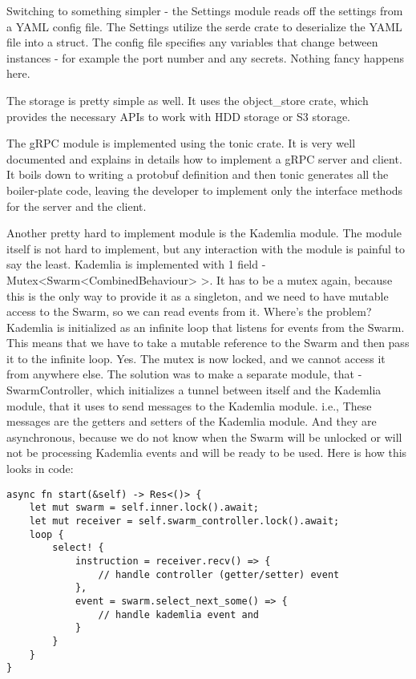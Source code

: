 \documentclass[ twoside,openright,titlepage,numbers=noenddot,headinclude,%
                footinclude=true,cleardoublepage=empty,abstractoff, %
                BCOR=5mm,paper=a4,fontsize=11pt,%
                ngerman,american,%
                ]{scrreprt}
\begin{document}
Switching to something simpler - the Settings module reads off the settings from a YAML config file.
The Settings utilize the serde crate to deserialize the YAML file into a struct.
The config file specifies any variables that change between instances - for example the port number and any secrets.
Nothing fancy happens here.

The storage is pretty simple as well.
It uses the object\_store crate, which provides the necessary APIs to work with HDD storage or S3 storage.

The gRPC module is implemented using the tonic crate.
It is very well documented and explains in details how to implement a gRPC server and client.
It boils down to writing a protobuf definition and then tonic generates all the boiler-plate code,
leaving the developer to implement only the interface methods for the server and the client.

Another pretty hard to implement module is the Kademlia module.
The module itself is not hard to implement, but any interaction with the module is painful to say the least.
Kademlia is implemented with 1 field - Mutex<Swarm<CombinedBehaviour> >.
It has to be a mutex again, because this is the only way to provide it as a singleton,
and we need to have mutable access to the Swarm, so we can read events from it.
Where's the problem? Kademlia is initialized as an infinite loop that listens for events from the Swarm.
This means that we have to take a mutable reference to the Swarm and then pass it to the infinite loop.
Yes. The mutex is now locked, and we cannot access it from anywhere else.
The solution was to make a separate module, that - SwarmController,
which initializes a tunnel between itself and the Kademlia module,
that it uses to send messages to the Kademlia module.
i.e., These messages are the getters and setters of the Kademlia module.
And they are asynchronous, because we do not know when the Swarm will be unlocked or will not be processing
Kademlia events and will be ready to be used.
Here is how this looks in code:

\begin{verbatim}
async fn start(&self) -> Res<()> {
    let mut swarm = self.inner.lock().await;
    let mut receiver = self.swarm_controller.lock().await;
    loop {
        select! {
            instruction = receiver.recv() => {
                // handle controller (getter/setter) event
            },
            event = swarm.select_next_some() => {
                // handle kademlia event and
            }
        }
    }
}
\end{verbatim}
\end{document}
